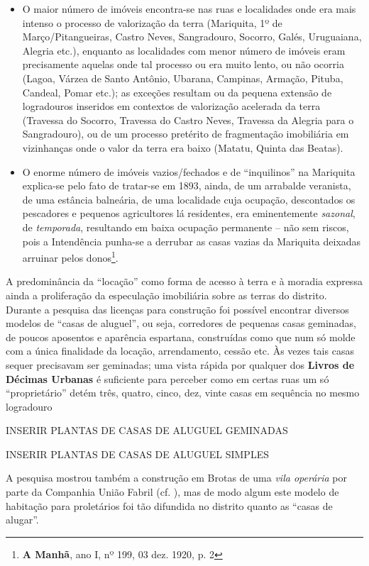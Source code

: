\begin{itemize}
\item O maior número de imóveis encontra-se nas ruas e localidades onde era mais intenso o processo de valorização da terra (Mariquita, 1º de Março/Pitangueiras, Castro Neves, Sangradouro, Socorro, Galés, Uruguaiana, Alegria etc.), enquanto as localidades com menor número de imóveis eram precisamente aquelas onde tal processo ou era muito lento, ou não ocorria (Lagoa, Várzea de Santo Antônio, Ubarana, Campinas, Armação, Pituba, Candeal, Pomar etc.); as exceções resultam ou da pequena extensão de logradouros inseridos em contextos de valorização acelerada da terra (Travessa do Socorro, Travessa do Castro Neves, Travessa da Alegria para o Sangradouro), ou de um processo pretérito de fragmentação imobiliária em vizinhanças onde o valor da terra era baixo (Matatu, Quinta das Beatas).
\item O enorme número de imóveis vazios/fechados e de ``inquilinos'' na Mariquita explica-se pelo fato de tratar-se em 1893, ainda, de um arrabalde veranista, de uma estância balneária, de uma localidade cuja ocupação, descontados os pescadores e pequenos agricultores lá residentes, era eminentemente \textit{sazonal}, de \textit{temporada}, resultando em baixa ocupação permanente -- não sem riscos, pois a Intendência punha-se a derrubar as casas vazias da Mariquita deixadas arruinar pelos donos\footnote{\textbf{A Manhã}, ano I, nº 199, 03 dez. 1920, p. 2}.
\end{itemize}

A predominância da ``locação'' como forma de acesso à terra e à moradia expressa ainda a proliferação da especulação imobiliária sobre as terras do distrito. Durante a pesquisa das licenças para construção foi possível encontrar diversos modelos de ``casas de aluguel'', ou seja, corredores de pequenas casas geminadas, de poucos aposentos e aparência espartana, construídas como que num só molde com a única finalidade da locação, arrendamento, cessão etc. Às vezes tais casas sequer precisavam ser geminadas; uma vista rápida por qualquer dos \textbf{Livros de Décimas Urbanas} é suficiente para perceber como em certas ruas um só ``proprietário'' detém três, quatro, cinco, dez, vinte casas em sequência no mesmo logradouro

INSERIR PLANTAS DE CASAS DE ALUGUEL GEMINADAS

INSERIR PLANTAS DE CASAS DE ALUGUEL SIMPLES

A pesquisa mostrou também a construção em Brotas de uma \textit{vila operária} por parte da Companhia União Fabril (cf. ), mas de modo algum este modelo de habitação para proletários foi tão difundida no distrito quanto as ``casas de alugar''.

